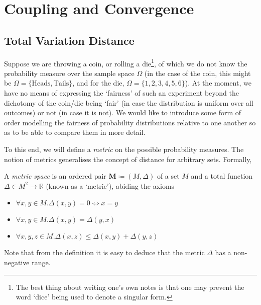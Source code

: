 \section{Coupling and Convergence}
                           	
	\subsection{Total Variation Distance}
	Suppose we are throwing a coin, or rolling a die\footnote{The best thing about writing one's own 
	notes is that one may prevent the word `dice' being used to denote a singular form.}, of which we 
	do not know the probability measure over the sample space $\Omega$ (in the case of the coin, this
	might be $\Omega=\{\mathrm{Heads},\mathrm{Tails}\}$, and for the die, $\Omega=\{1,2,3,4,5,6\}$).
	At the moment, we have no means of expressing the `fairness' of such an experiment beyond the 
	dichotomy of the coin/die being `fair' (in case the distribution is uniform over all outcomes)
	or not (in case it is not). We would like to introduce some form of order modelling the 
	fairness of probability distributions relative to one another so as to be able to compare them 
	in more detail.

	To this end, we will define a \emph{metric} on the possible probability measures. The
	notion of metrics generalises the concept of distance for arbitrary sets. Formally,
	\begin{definition}
		A \emph{metric space} is an ordered pair $\mathbf{M} \coloneqq (M, \Delta)$ of 
		a set $M$ and a total function $\Delta \in M^2 \rightarrow \mathbb{R}$ (known as
		a `metric'), abiding the axioms
		\begin{itemize}
			\item $\forall x,y \in M . \Delta(x,y) = 0 \iff x = y$
			\item $\forall x,y \in M . \Delta(x,y) = \Delta(y,x)$
			\item $\forall x,y,z \in M . \Delta(x,z) \leq \Delta(x,y)+\Delta(y,z)$
		\end{itemize}
	\end{definition}
	Note that from the definition it is easy to deduce that the metric $\Delta$ has a 
	non-negative range. 

